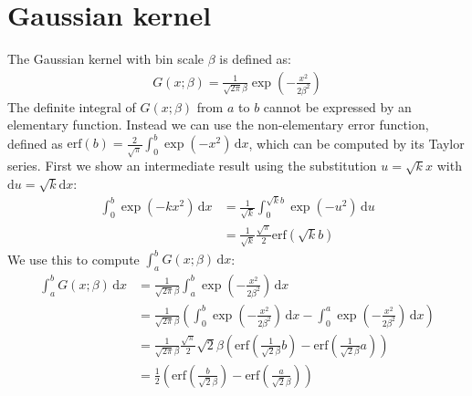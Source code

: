 \documentclass[thesis.tex]{subfiles}
\begin{document}
\section{Gaussian kernel}
%
The Gaussian kernel with bin scale $\beta$ is defined as:
%
\begin{align*}
G(x;\beta) = \frac{1}{\sqrt{2\pi} \beta}
\exp\left( -\frac{x^2}{2 \beta^2} \right)
\end{align*}
%
The definite integral of $G(x;\beta)$ from $a$ to $b$ cannot be expressed by an elementary function. Instead we can use the non-elementary error function, defined as $\mathrm{erf}(b) = \frac{2}{\sqrt{\pi}} \int_0^b \exp(-x^2) \,\mathrm dx$, which can be computed by its Taylor series. First we show an intermediate result using the substitution $u = \sqrt{k} x$ with $\mathrm du = \sqrt{k} \mathrm dx$:
%
\begin{align*}
\int_0^b \exp(-k x^2) \,\mathrm dx
&= \frac{1}{\sqrt{k}} \int_0^{\sqrt{k}b} \exp(-u^2) \,\mathrm du \\
&= \frac{1}{\sqrt{k}} \frac{\sqrt{\pi}}{2} \mathrm{erf} \left( \sqrt{k} b \right)
\end{align*}
%
We use this to compute $\int_a^b G(x;\beta) \,\mathrm dx$:
%
\begin{align*}
\int_a^b G(x;\beta) \,\mathrm dx
&= \frac{1}{\sqrt{2\pi} \beta} \int_a^b \exp\left( -\frac{x^2}{2 \beta^2} \right) \,\mathrm dx \\
&= \frac{1}{\sqrt{2\pi} \beta} \left( \int_0^b \exp\left( -\frac{x^2}{2 \beta^2} \right) \,\mathrm dx - \int_0^a \exp\left( -\frac{x^2}{2 \beta^2} \right) \,\mathrm dx \right) \\
&= \frac{1}{\sqrt{2\pi} \beta} \frac{\sqrt{\pi}}{2} \sqrt{2} \beta \left(
\mathrm{erf} \left( \frac{1}{\sqrt{2} \beta} b \right) -
\mathrm{erf} \left( \frac{1}{\sqrt{2} \beta} a \right) \right) \\
&= \frac{1}{2} \left(
\mathrm{erf} \left( \frac{b}{\sqrt{2} \beta} \right) -
\mathrm{erf} \left( \frac{a}{\sqrt{2} \beta} \right)
\right)
\end{align*}
%
\end{document}
